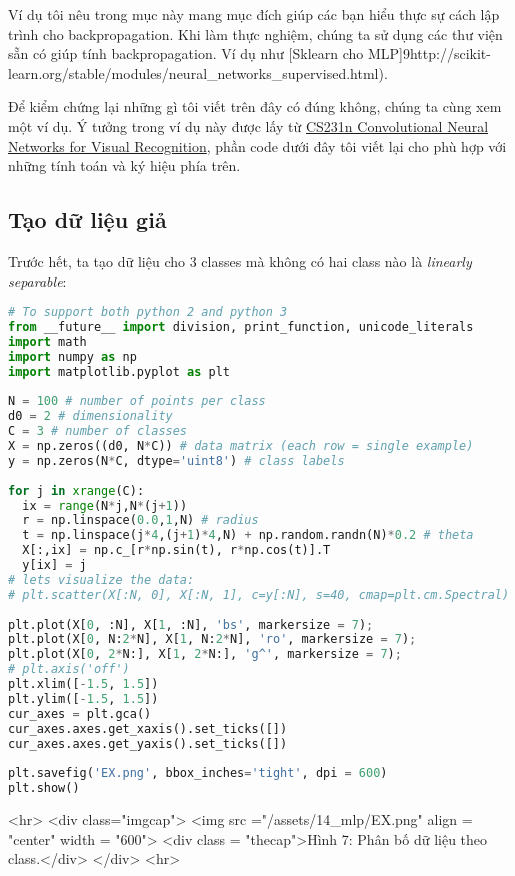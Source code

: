 Ví dụ tôi nêu trong mục này mang mục đích giúp các bạn hiểu thực sự cách lập trình cho backpropagation. Khi làm thực nghiệm, chúng ta sử dụng các thư viện sẵn có giúp tính backpropagation. Ví dụ như [Sklearn cho MLP]9http://scikit-learn.org/stable/modules/neural_networks_supervised.html). 
 
Để kiểm chứng lại những gì tôi viết trên đây có đúng không, chúng ta cùng xem một ví dụ. Ý tưởng trong ví dụ này được lấy từ \href{http://cs231n.github.io/neural-networks-case-study/}{CS231n Convolutional Neural Networks for Visual Recognition}, phần code dưới đây tôi viết lại cho phù hợp với những tính toán và ký hiệu phía trên. 
 
 
\subsection{Tạo dữ liệu giả}
 
Trước hết, ta tạo dữ liệu cho 3 classes mà không có hai class nào là \textit{linearly separable}: 
 
\begin{lstlisting}[language=Python]
# To support both python 2 and python 3 
from __future__ import division, print_function, unicode_literals 
import math 
import numpy as np 
import matplotlib.pyplot as plt 
 
N = 100 # number of points per class 
d0 = 2 # dimensionality 
C = 3 # number of classes 
X = np.zeros((d0, N*C)) # data matrix (each row = single example) 
y = np.zeros(N*C, dtype='uint8') # class labels 
 
for j in xrange(C): 
  ix = range(N*j,N*(j+1)) 
  r = np.linspace(0.0,1,N) # radius 
  t = np.linspace(j*4,(j+1)*4,N) + np.random.randn(N)*0.2 # theta 
  X[:,ix] = np.c_[r*np.sin(t), r*np.cos(t)].T 
  y[ix] = j 
# lets visualize the data: 
# plt.scatter(X[:N, 0], X[:N, 1], c=y[:N], s=40, cmap=plt.cm.Spectral) 
 
plt.plot(X[0, :N], X[1, :N], 'bs', markersize = 7); 
plt.plot(X[0, N:2*N], X[1, N:2*N], 'ro', markersize = 7); 
plt.plot(X[0, 2*N:], X[1, 2*N:], 'g^', markersize = 7); 
# plt.axis('off') 
plt.xlim([-1.5, 1.5]) 
plt.ylim([-1.5, 1.5]) 
cur_axes = plt.gca() 
cur_axes.axes.get_xaxis().set_ticks([]) 
cur_axes.axes.get_yaxis().set_ticks([]) 
 
plt.savefig('EX.png', bbox_inches='tight', dpi = 600) 
plt.show() 
\end{lstlisting}
 
 
 
<hr> 
<div class="imgcap"> 
 <img src ="/assets/14_mlp/EX.png" align = "center" width = "600"> 
 <div class = "thecap">Hình 7: Phân bố dữ liệu theo class.</div> 
</div> 
<hr> 
 
